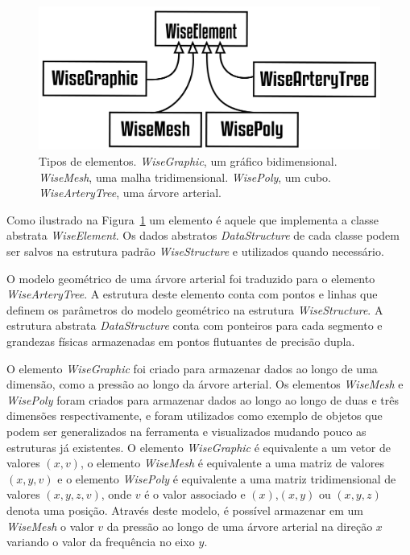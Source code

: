 \begin{figure}[!htbp]
	\centering
	\includegraphics[width=\textwidth]{Figures/WiseElements@16x.png}
	\caption{Tipos de elementos. \textit{WiseGraphic}, um gráfico bidimensional. \textit{WiseMesh}, uma malha tridimensional. \textit{WisePoly}, um cubo. \textit{WiseArteryTree}, uma árvore arterial.}
	\label{fig2:wiselements}
\end{figure}

Como ilustrado na Figura~\ref{fig2:wiselements} um elemento é aquele que implementa a classe abstrata \textit{WiseElement}. Os dados abstratos \textit{DataStructure} de cada classe podem ser salvos na estrutura padrão \textit{WiseStructure} e utilizados quando necessário. 

O modelo geométrico de uma árvore arterial foi traduzido para o elemento \textit{WiseArteryTree}. A estrutura deste elemento conta com pontos e linhas que definem os parâmetros do modelo geométrico na estrutura \textit{WiseStructure}. A estrutura abstrata \textit{DataStructure} conta com ponteiros para cada segmento e grandezas físicas armazenadas em pontos flutuantes de precisão dupla.


O elemento \textit{WiseGraphic} foi criado para armazenar dados ao longo de uma dimensão, como a pressão ao longo da árvore arterial. Os elementos \textit{WiseMesh} e \textit{WisePoly} foram criados para armazenar dados ao longo ao longo de duas e três dimensões  respectivamente,  e foram utilizados como exemplo de objetos que podem ser generalizados na ferramenta e visualizados mudando pouco as estruturas já existentes. O elemento \textit{WiseGraphic} é equivalente a um vetor de valores $(x,v)$, o elemento \textit{WiseMesh} é equivalente a uma matriz de valores $(x,y,v)$ e o elemento \textit{WisePoly} é equivalente a uma matriz tridimensional de valores $(x,y,z,v)$, onde $v$ é o valor associado e $(x)$,$(x,y)$ ou $(x,y,z)$ denota uma posição. Através deste modelo, é possível armazenar em um \textit{WiseMesh} o valor $v$ da pressão ao longo de uma árvore arterial na direção $x$ variando o valor da frequência no eixo $y$.

